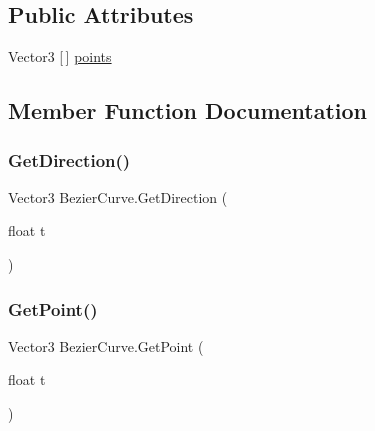 \subsection*{Public Attributes}
\begin{DoxyCompactItemize}
\item 
Vector3 \mbox{[}$\,$\mbox{]} \hyperlink{classBezierCurve_a77f62121b4b7ffb30b169d91691ebcbf}{points}
\end{DoxyCompactItemize}


\subsection{Member Function Documentation}
\mbox{\label{classBezierCurve_aee84a49317214403c6f59c2a60903662}} 
\subsubsection{\texorpdfstring{Get\+Direction()}{GetDirection()}}
{\footnotesize\ttfamily Vector3 Bezier\+Curve.\+Get\+Direction (\begin{DoxyParamCaption}\item[{float}]{t }\end{DoxyParamCaption})\hspace{0.3cm}{\ttfamily [inline]}}

\mbox{\label{classBezierCurve_a0ac697a04b35213e11d9c93a183ee7fe}} 
\subsubsection{\texorpdfstring{Get\+Point()}{GetPoint()}}
{\footnotesize\ttfamily Vector3 Bezier\+Curve.\+Get\+Point (\begin{DoxyParamCaption}\item[{float}]{t }\end{DoxyParamCaption})\hspace{0.3cm}{\ttfamily [inline]}}

\mbox{\label{classBezierCurve_a3b39e1db5e230d6c4a89ec0386779efa}} 
